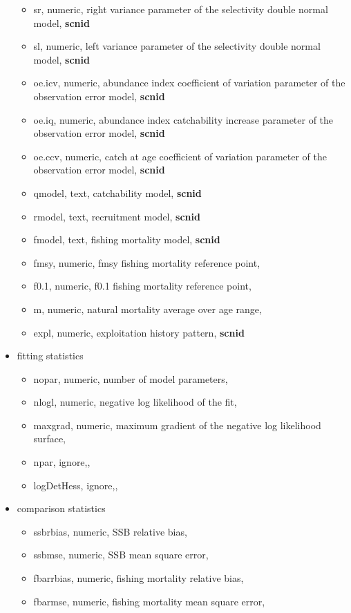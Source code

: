 \documentclass[a4paper]{article}\usepackage{graphicx, color}
\begin{document}
\begin{itemize}
\begin{itemize}
		\item sr, numeric, right variance parameter of the selectivity double normal model, {\bf scnid}
		\item sl, numeric, left variance parameter of the selectivity double normal model, {\bf scnid}
		\item oe.icv, numeric, abundance index coefficient of variation parameter of the observation error model, {\bf scnid}
		\item oe.iq, numeric, abundance index catchability increase parameter of the observation error model, {\bf scnid}
		\item oe.ccv, numeric, catch at age coefficient of variation parameter of the observation error model, {\bf scnid}
		\item qmodel, text, catchability model, {\bf scnid}
		\item rmodel, text, recruitment model, {\bf scnid}
		\item fmodel, text, fishing mortality model, {\bf scnid}
		\item fmsy, numeric, fmsy fishing mortality reference point,
		\item f0.1, numeric, f0.1 fishing mortality reference point,
		\item m, numeric, natural mortality average over age range, 
		\item expl, numeric, exploitation history pattern, {\bf scnid}
	\end{itemize}
	\item fitting statistics
	\begin{itemize}
		\item nopar, numeric, number of model parameters, 
		\item nlogl, numeric, negative log likelihood of the fit,
		\item maxgrad, numeric, maximum gradient of the negative log likelihood surface,
		\item npar, ignore,, 
		\item logDetHess, ignore,,
	\end{itemize}
	\item comparison statistics
	\begin{itemize}
		\item ssbrbias, numeric, SSB relative bias, 
		\item ssbmse, numeric, SSB mean square error,
		\item fbarrbias, numeric, fishing mortality relative bias,
		\item fbarmse, numeric, fishing mortality mean square error,

\end{itemize}
\end{itemize}
\end{document}

